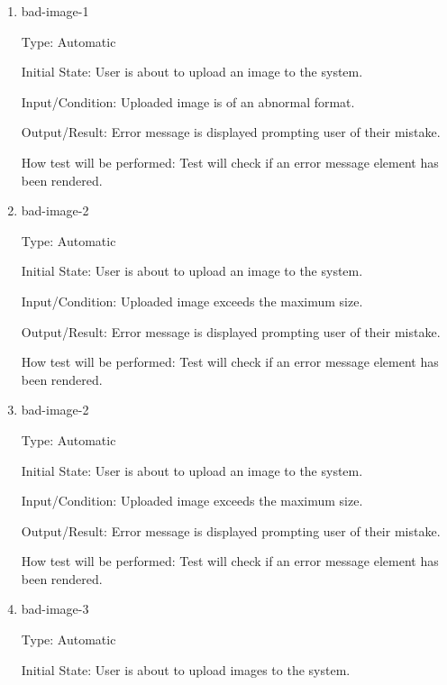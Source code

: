 \documentclass[12pt, titlepage]{article}
\begin{document}
	\begin{enumerate}
		
		\item{bad-image-1\\}
		
		Type: Automatic 
		
		Initial State: User is about to upload an image to the system.
		
		Input/Condition: Uploaded image is of an abnormal format.

		Output/Result: Error message is displayed prompting user of their 
		mistake.
		
		How test will be performed: Test will check if an error message element 
		has been rendered.
		
		\item{bad-image-2\\}
		
		Type: Automatic 
		
		Initial State: User is about to upload an image to the system.
		
		Input/Condition: Uploaded image exceeds the maximum size.
		
		Output/Result: Error message is displayed prompting user of their 
		mistake.
		
		How test will be performed: Test will check if an error message element 
		has been rendered.
		
		\item{bad-image-2\\}
		
		Type: Automatic
		
		Initial State: User is about to upload an image to the system.
		
		Input/Condition: Uploaded image exceeds the maximum size.
		
		Output/Result: Error message is displayed prompting user of their 
		mistake.
		
		How test will be performed: Test will check if an error message element 
		has been rendered.
		
		
		\item{bad-image-3\\}

		Type: Automatic
		
		Initial State: User is about to upload images to the system.
		

\end{enumerate}
\end{document}
